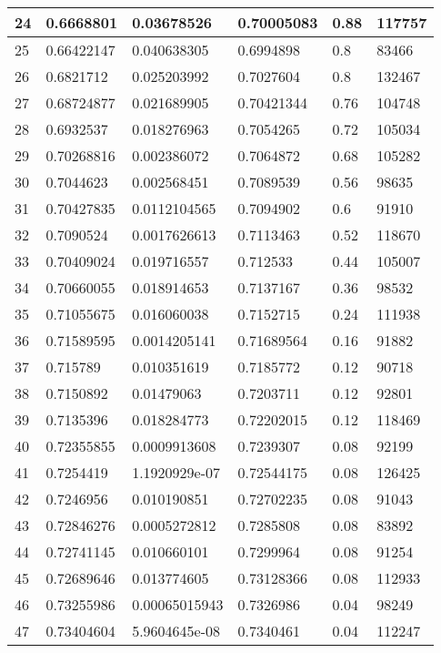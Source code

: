 \begin{longtable}{|l|l|l|l|l|l|}
24 & 0.6668801 & 0.03678526 & 0.70005083 & 0.88 & 117757 \\ \hline 
25 & 0.66422147 & 0.040638305 & 0.6994898 & 0.8 & 83466 \\ \hline 
26 & 0.6821712 & 0.025203992 & 0.7027604 & 0.8 & 132467 \\ \hline 
27 & 0.68724877 & 0.021689905 & 0.70421344 & 0.76 & 104748 \\ \hline 
28 & 0.6932537 & 0.018276963 & 0.7054265 & 0.72 & 105034 \\ \hline 
29 & 0.70268816 & 0.002386072 & 0.7064872 & 0.68 & 105282 \\ \hline 
30 & 0.7044623 & 0.002568451 & 0.7089539 & 0.56 & 98635 \\ \hline 
31 & 0.70427835 & 0.0112104565 & 0.7094902 & 0.6 & 91910 \\ \hline 
32 & 0.7090524 & 0.0017626613 & 0.7113463 & 0.52 & 118670 \\ \hline 
33 & 0.70409024 & 0.019716557 & 0.712533 & 0.44 & 105007 \\ \hline 
34 & 0.70660055 & 0.018914653 & 0.7137167 & 0.36 & 98532 \\ \hline 
35 & 0.71055675 & 0.016060038 & 0.7152715 & 0.24 & 111938 \\ \hline 
36 & 0.71589595 & 0.0014205141 & 0.71689564 & 0.16 & 91882 \\ \hline 
37 & 0.715789 & 0.010351619 & 0.7185772 & 0.12 & 90718 \\ \hline 
38 & 0.7150892 & 0.01479063 & 0.7203711 & 0.12 & 92801 \\ \hline 
39 & 0.7135396 & 0.018284773 & 0.72202015 & 0.12 & 118469 \\ \hline 
40 & 0.72355855 & 0.0009913608 & 0.7239307 & 0.08 & 92199 \\ \hline 
41 & 0.7254419 & 1.1920929e-07 & 0.72544175 & 0.08 & 126425 \\ \hline 
42 & 0.7246956 & 0.010190851 & 0.72702235 & 0.08 & 91043 \\ \hline 
43 & 0.72846276 & 0.0005272812 & 0.7285808 & 0.08 & 83892 \\ \hline 
44 & 0.72741145 & 0.010660101 & 0.7299964 & 0.08 & 91254 \\ \hline 
45 & 0.72689646 & 0.013774605 & 0.73128366 & 0.08 & 112933 \\ \hline 
46 & 0.73255986 & 0.00065015943 & 0.7326986 & 0.04 & 98249 \\ \hline 
47 & 0.73404604 & 5.9604645e-08 & 0.7340461 & 0.04 & 112247 \\ \hline 

\end{longtable}
